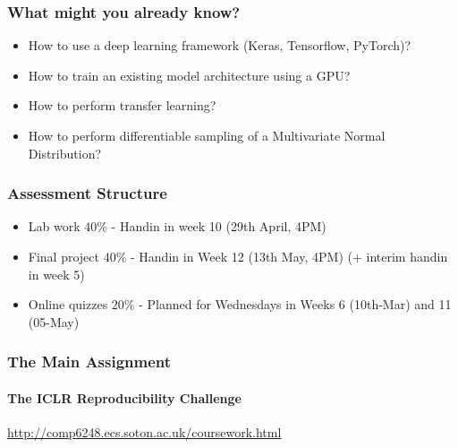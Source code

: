 \documentclass[\beamerclass]{beamer}
\begin{document}
\begin{frame}
	\frametitle{What might you already know?}	
	\begin{itemize}
	\item<+-> How to use a deep learning framework (Keras, Tensorflow, PyTorch)?
	\item<+-> How to train an existing model architecture using a GPU?
	\item<+-> How to perform transfer learning?
	\item<+-> How to perform differentiable sampling of a Multivariate Normal Distribution?
	\end{itemize}
\end{frame}

\begin{frame}
	\frametitle{Assessment Structure}
	\begin{itemize}
		\item Lab work $40\%$ - Handin in week 10 (29th April, 4PM)
		\item Final project $40\%$  - Handin in Week 12 (13th May, 4PM) (+ interim handin in week 5)
		\item Online quizzes $20\%$ - Planned for Wednesdays in Weeks 6 (10th-Mar) and 11 (05-May) 
	\end{itemize}
\end{frame}

	
	

\begin{frame}
	\frametitle{The Main Assignment}
	\framesubtitle{The ICLR Reproducibility Challenge}
	\url{http://comp6248.ecs.soton.ac.uk/coursework.html}
\end{frame}
\end{document}
